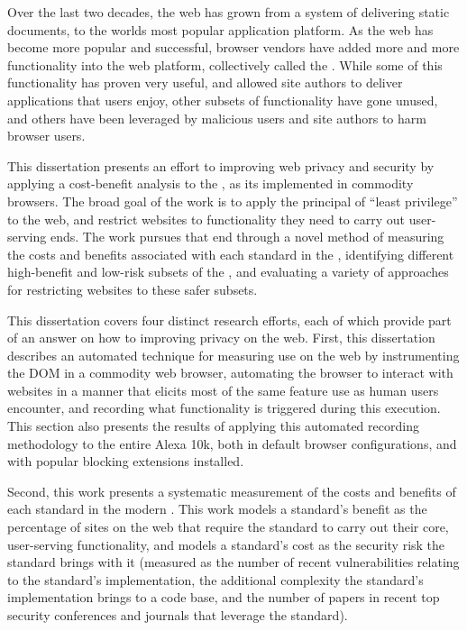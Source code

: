 \summary
Over the last two decades, the web has grown from a system of delivering
static documents, to the worlds most popular application platform.  As the
web has become more popular and successful, browser vendors have added more
and more functionality into the web platform, collectively called the \WAPI.
While some of this functionality has proven very useful, and allowed site
authors to deliver applications that users enjoy, other subsets of functionality
have gone unused, and others have been leveraged by malicious users and site
authors to harm browser users.

This dissertation presents an effort to improving web privacy and security
by applying a cost-benefit analysis to the \WAPI, as its implemented in
commodity browsers.  The broad goal of the work is to apply the principal of
``least privilege'' to the web, and restrict websites to functionality
they need to carry out user-serving ends.  The work pursues that
end through a novel method of measuring the costs and benefits associated with
each standard in the \WAPI, identifying different high-benefit and low-risk
subsets of the \WAPI, and evaluating a variety of approaches for
restricting websites to these safer subsets.

This dissertation covers four distinct research efforts, each of which provide
part of an answer on how to improving privacy on the web.  First, this dissertation
describes an automated technique for measuring \WAPI use on the web by
instrumenting the DOM in a commodity web browser, automating the browser
to interact with websites in a manner that elicits most of the same
feature use as human users encounter, and recording what functionality is
triggered during this execution.  This section also presents the results of
applying this automated recording methodology to the entire Alexa 10k, both
in default browser configurations, and with popular blocking extensions installed.

Second, this work presents a systematic measurement of the costs and benefits of
each standard in the modern \WAPI.  This work models a standard's benefit
as the percentage of sites on the web that require the standard to carry out
their core, user-serving functionality, and models a standard's cost as
the security risk the standard brings with it (measured as the number of
recent vulnerabilities relating to the standard's implementation, the additional
complexity the standard's implementation brings to a code base, and the number
of papers in recent top security conferences and journals that leverage the
standard).

